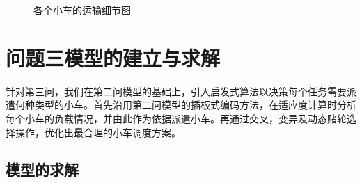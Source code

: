 \documentclass{whutmod}
\begin{document}
\begin{figure}[H]	
	\centering
	\caption{各个小车的运输细节图}
	\label{fisg}
\end{figure}

    \section{问题三模型的建立与求解}
  针对第三问，我们在第二问模型的基础上，引入启发式算法以决策每个任务需要派遣何种类型的小车。首先沿用第二问模型的插板式编码方法，在适应度计算时分析每个小车的负载情况，并由此作为依据派遣小车。再通过交叉，变异及动态赌轮选择操作，优化出最合理的小车调度方案。  
  \subsection{模型的求解}
\end{document}
